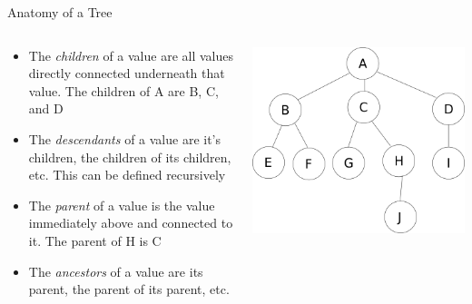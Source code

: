 \documentclass[
  ignorenonframetext,
]{beamer}
\begin{document}
\begin{frame}{Anatomy of a Tree}
\protect\hypertarget{anatomy-of-a-tree-1}{}
\begin{columns}[T]
\begin{column}{0.6\textwidth}
\begin{itemize}
\item
  The \emph{children} of a value are all values directly connected
  underneath that value. The children of A are B, C, and D
\item
  The \emph{descendants} of a value are it's children, the children of
  its children, etc. This can be defined recursively
\item
  The \emph{parent} of a value is the value immediately above and
  connected to it. The parent of H is C
\item
  The \emph{ancestors} of a value are its parent, the parent of its
  parent, etc.
\end{itemize}
\end{column}

\begin{column}{0.4\textwidth}
\includegraphics{images/tree.png}
\end{column}
\end{columns}
\end{frame}
\end{document}
